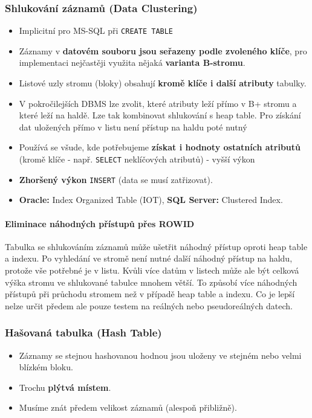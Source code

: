 \subsubsection{Shlukování záznamů (Data Clustering)}
\begin{itemize}
\item Implicitní pro MS-SQL při \texttt{CREATE TABLE}
\item Záznamy v \textbf{datovém souboru jsou seřazeny podle zvoleného klíče}, pro implementaci nejčastěji využita nějaká \textbf{varianta B-stromu}.
\item Listové uzly stromu (bloky) obsahují \textbf{kromě klíče i další atributy} tabulky.
\item V pokročilejších DBMS lze zvolit, které atributy leží přímo v B+ stromu a které leží na haldě. Lze tak kombinovat shlukování s heap table. Pro získání dat uložených přímo v listu není přístup na haldu poté nutný
\item Používá se všude, kde potřebujeme \textbf{získat i hodnoty ostatních atributů} (kromě klíče - např. \texttt{SELECT} neklíčových atributů) - vyšší výkon
\item \textbf{Zhoršený výkon} \texttt{INSERT} (data se musí zatřizovat).
\item \textbf{Oracle:} Index Organized Table (IOT), \textbf{SQL Server:} Clustered Index.
\end{itemize}

\paragraph{Eliminace náhodných přístupů přes ROWID} Tabulka se shlukováním záznamů může ušetřit náhodný přístup oproti heap table a indexu. Po vyhledání ve stromě není nutné další náhodný přístup na haldu, protože vše potřebné je v listu. Kvůli více datům v listech může ale být celková výška stromu ve shlukované tabulce mnohem větší. To způsobí více náhodných přístupů při průchodu stromem než  v případě heap table a indexu. Co je lepší nelze určit předem ale pouze testem na reálných nebo pseudoreálných datech.

\subsubsection{Hašovaná tabulka (Hash Table)}
\begin{itemize}
\item Záznamy se stejnou hashovanou hodnou jsou uloženy ve stejném nebo velmi blízkém bloku.
\item Trochu \textbf{plýtvá místem}.
\item Musíme znát předem velikost záznamů (alespoň přibližně).
\end{itemize}

